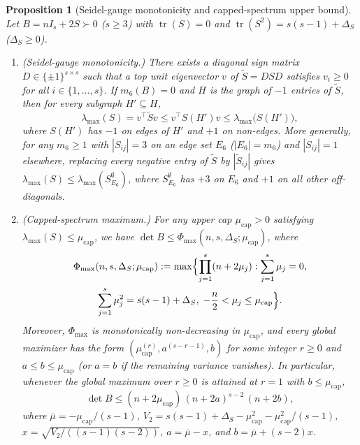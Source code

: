 \documentclass[11pt]{article}
\newtheorem{proposition}{Proposition}
\theoremstyle{remark}
\newcommand{\tr}{\operatorname{tr}}
\begin{document}
\begin{proposition}[Seidel-gauge monotonicity and capped-spectrum upper bound]\label{prop:capped_seidel}
Let $B = n I_s + 2 S \succ 0$ ($s \ge 3$) with $\tr(S) = 0$ and $\tr(S^2) = s(s - 1) + \Delta_S$ ($\Delta_S \ge 0$).
\begin{enumerate}[leftmargin=*,topsep=2pt,itemsep=1pt]
\item \emph{(Seidel-gauge monotonicity.)} There exists a diagonal sign matrix $D \in \{\pm 1\}^{s \times s}$ such that a top unit eigenvector $v$ of $\widetilde{S} = D S D$ satisfies $v_i \ge 0$ for all $i \in \{1, \dots, s\}$. If $m_6(B) = 0$ and $H$ is the graph of $-1$ entries of $\widetilde{S}$, then for every subgraph $H' \subseteq H$,
\[
  \lambda_{\max}(S) = v^\top \widetilde{S} v \le v^\top S(H') v \le \lambda_{\max}\bigl(S(H')\bigr),
\]
where $S(H')$ has $-1$ on edges of $H'$ and $+1$ on non-edges. More generally, for any $m_6 \ge 1$ with $|S_{ij}| = 3$ on an edge set $E_6$ ($|E_6| = m_6$) and $|S_{ij}| = 1$ elsewhere, replacing every negative entry of $\widetilde{S}$ by $|\widetilde{S}_{ij}|$ gives $\lambda_{\max}(S) \le \lambda_{\max}(S_{E_6}^{\emptyset})$, where $S_{E_6}^{\emptyset}$ has $+3$ on $E_6$ and $+1$ on all other off-diagonals.
\item \emph{(Capped-spectrum maximum.)} For any upper cap $\mu_{\mathrm{cap}} > 0$ satisfying $\lambda_{\max}(S) \le \mu_{\mathrm{cap}}$, we have $\det B \le \Phi_{\max}(n, s, \Delta_S; \mu_{\mathrm{cap}})$, where
\begin{multline*}
  \Phi_{\max}(n, s, \Delta_S; \mu_{\mathrm{cap}})
  := \max \Bigl\{ \prod_{j=1}^s (n + 2\mu_j) : \sum_{j=1}^s \mu_j = 0, \\
  \sum_{j=1}^s \mu_j^2 = s(s - 1) + \Delta_S,\; -\frac{n}{2} < \mu_j \le \mu_{\mathrm{cap}} \Bigr\}.
\end{multline*}
Moreover, $\Phi_{\max}$ is monotonically non-decreasing in $\mu_{\mathrm{cap}}$, and every global maximizer has the form $(\mu_{\mathrm{cap}}^{(r)}, a^{(s - r - 1)}, b)$ for some integer $r \ge 0$ and $a \le b \le \mu_{\mathrm{cap}}$ (or $a = b$ if the remaining variance vanishes). In particular, whenever the global maximum over $r \ge 0$ is attained at $r = 1$ with $b \le \mu_{\mathrm{cap}}$,
\begin{equation}\label{eq:seidel_var}
  \det B \le (n + 2\mu_{\mathrm{cap}})\,(n + 2a)^{s-2}\,(n + 2b),
\end{equation}
where $\bar{\mu} = -\mu_{\mathrm{cap}}/(s-1)$, $V_2 = s(s-1) + \Delta_S - \mu_{\mathrm{cap}}^2 - \mu_{\mathrm{cap}}^2/(s-1)$, $x = \sqrt{V_2 / ((s-1)(s-2))}$, $a = \bar{\mu} - x$, and $b = \bar{\mu} + (s-2)x$.
\end{enumerate}
\end{proposition}
\end{document}
